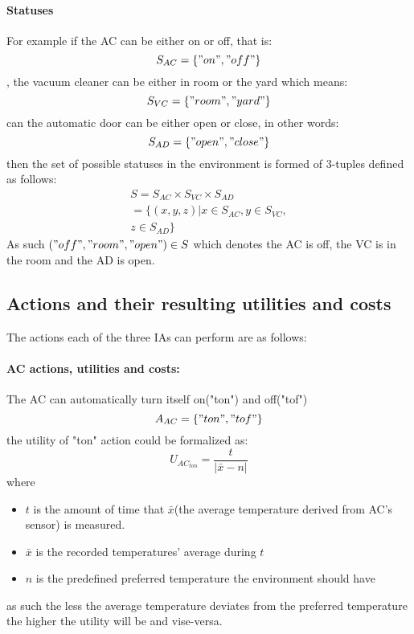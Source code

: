 \documentclass{article}
\begin{document}
\begin{multicols}{2}
			\paragraph{Statuses} For example if the AC can be either on or off, that is:
				\begin{equation}
					S_{AC}=\{"on","off"\}
					\label{eq:ac-statuses}
				\end{equation}
				, the vacuum cleaner can be either in room or the yard which means:
				\begin{equation}
					S_{VC}=\{"room","yard"\} 
					\label{eq:vc-statuses}
				\end{equation}
				can the automatic door can be either open or close, in other words:
				\begin{equation}
					S_{AD}=\{"open","close"\}
					\label{eq:ad-statuses}
				\end{equation}
				then the set of possible statuses in the environment is formed of 3-tuples defined as follows:
				\begin{multline}
					S = S_{AC} \times S_{VC} \times S_{AD} 
					\\
					= \{(x,y,z)| x \in S_{AC}, y \in S_{VC}, 
					\\
					z \in S_{AD} \} 
					\label{eq:example-environment-statuses}
				\end{multline}	
				As such $("off","room","open") \in S$ which denotes the AC is off, the VC is in the room and the AD is open. 
				
			
			\subsection{Actions and their resulting utilities and costs}
				The actions each of the three IAs can perform are as follows:			
				\paragraph{AC actions, utilities and costs:}
					The AC can automatically turn itself on("ton") and off("tof")
					\begin{equation}
						A_{AC}=\{"ton","tof"\}
						\label{eq:ac-actions}
					\end{equation}
					the utility of "ton" action could be formalized as:
					\begin{equation}
						U_{{AC}_{ton}}= \frac{t}{|\bar{x}-n|}
						\label{eq:ac-action-utility-ton}
					\end{equation}
					where  
					\begin{itemize}
						\item $t$ is the amount of time that $\bar{x}$(the average temperature derived from AC's sensor) is measured.
						\item $\bar{x}$ is the recorded temperatures' average during $t$
						\item $n$ is the predefined preferred temperature the environment should have
					\end{itemize}
					as such the less the average temperature deviates from the preferred temperature the higher the utility will be and vise-versa. 
			 

\end{multicols}
\end{document}
